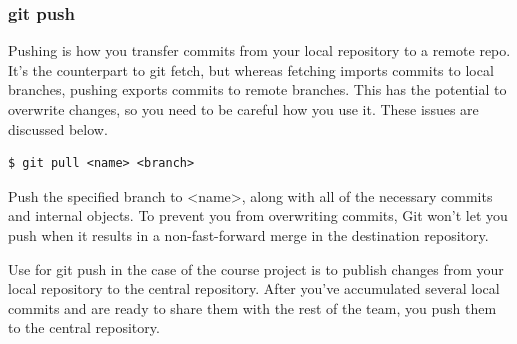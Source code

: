 \documentclass{article}
\begin{document}
\begin{center}
\end{center}


\subsubsection*{git push}

Pushing is how you transfer commits from your local repository to a
remote repo. It's the counterpart to git fetch, but whereas fetching
imports commits to local branches, pushing exports commits to remote
branches. This has the potential to overwrite changes, so you need to
be careful how you use it. These issues are discussed below.

\begin{lstlisting}
$ git pull <name> <branch>
\end{lstlisting}

Push the specified branch to <name>, along with all of the necessary
commits and internal objects. To prevent you from overwriting commits, Git
won't let you push when it results in a non-fast-forward merge in the
destination repository.

Use for git push in the case of the course project is to publish changes
from your local repository to the central repository. 
After you've accumulated several local
commits and are ready to share them with the rest of the team, you
push them to the central repository.
\end{document}
